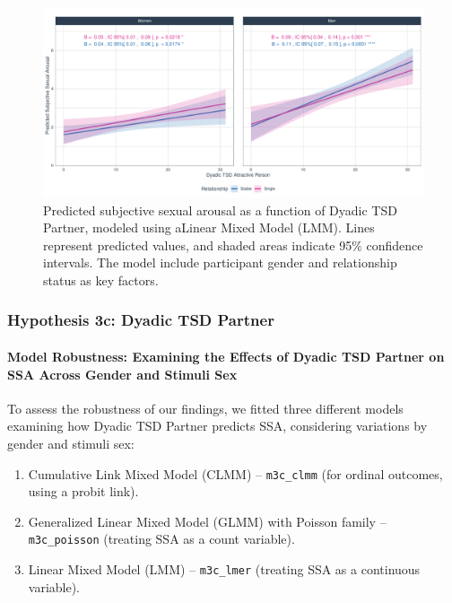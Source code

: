 \documentclass[
  bookmarksnumbered]{article}
\providecommand{\tightlist}{%
  \setlength{\itemsep}{0pt}\setlength{\parskip}{0pt}}
\begin{document}
\begin{figure}
\centering
\includegraphics{Sexual_Desire_Arousal_files/figure-latex/fig-h3b-1.pdf}
\caption{\label{fig:fig-h3b}Predicted subjective sexual arousal as a function of Dyadic TSD Partner, modeled using aLinear Mixed Model (LMM). Lines represent predicted values, and shaded areas indicate 95\% confidence intervals. The model include participant gender and relationship status as key factors.}
\end{figure}

\subsubsection{Hypothesis 3c: Dyadic TSD Partner}\label{hyp3c}

\paragraph{Model Robustness: Examining the Effects of Dyadic TSD Partner on SSA Across Gender and Stimuli Sex}\label{model-robustness-examining-the-effects-of-dyadic-tsd-partner-on-ssa-across-gender-and-stimuli-sex-1}

To assess the robustness of our findings, we fitted three different models examining how Dyadic TSD Partner predicts SSA, considering variations by gender and stimuli sex:

\begin{enumerate}
\def\labelenumi{\arabic{enumi}.}
\tightlist
\item
  Cumulative Link Mixed Model (CLMM) -- \texttt{m3c\_clmm} (for ordinal outcomes, using a probit link).
\item
  Generalized Linear Mixed Model (GLMM) with Poisson family -- \texttt{m3c\_poisson} (treating SSA as a count variable).
\item
  Linear Mixed Model (LMM) -- \texttt{m3c\_lmer} (treating SSA as a continuous variable).
\end{enumerate}
\end{document}
